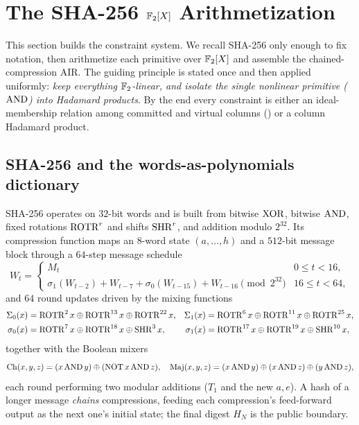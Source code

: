 \section{The SHA-256 $\mathbb{F}_2[X]$ Arithmetization}
\label{sec:arith}

This section builds the constraint system. We recall SHA-256 only enough
to fix notation, then arithmetize each primitive over $\mathbb{F}_2[X]$ and
assemble the chained-compression AIR. The guiding principle is stated
once and then applied uniformly: \emph{keep everything $\mathbb{F}_2$-linear,
and isolate the single nonlinear primitive ($\operatorname{AND}$) into Hadamard
products}. By the end every constraint is either an ideal-membership
relation among committed and virtual columns () or a
column Hadamard product.

\subsection{SHA-256 and the words-as-polynomials dictionary}
\label{sec:sha-recap}

SHA-256 operates on $32$-bit words and is built from bitwise $\operatorname{XOR}$,
bitwise $\operatorname{AND}$, fixed rotations $\operatorname{ROTR}^r$ and shifts $\operatorname{SHR}^r$, and
addition modulo $2^{32}$. Its compression function maps an $8$-word
state $(a,\dots,h)$ and a $512$-bit message block through a $64$-step
message schedule
\begin{equation}
  \label{eq:msched}
  W_t = \begin{cases}
    M_t & 0 \le t < 16,\\
    \sigma_1(W_{t-2}) + W_{t-7} + \sigma_0(W_{t-15}) + W_{t-16} \pmod{2^{32}}
    & 16 \le t < 64,
  \end{cases}
\end{equation}
and $64$ round updates driven by the mixing functions
\begin{align*}
  \Sigma_0(x) &= \operatorname{ROTR}^{2}x \oplus \operatorname{ROTR}^{13}x \oplus \operatorname{ROTR}^{22}x, &
  \Sigma_1(x) &= \operatorname{ROTR}^{6}x \oplus \operatorname{ROTR}^{11}x \oplus \operatorname{ROTR}^{25}x,\\
  \sigma_0(x) &= \operatorname{ROTR}^{7}x \oplus \operatorname{ROTR}^{18}x \oplus \operatorname{SHR}^{3}x, &
  \sigma_1(x) &= \operatorname{ROTR}^{17}x \oplus \operatorname{ROTR}^{19}x \oplus \operatorname{SHR}^{10}x,
\end{align*}
together with the Boolean mixers
\[
  \operatorname{Ch}(x,y,z) = (x \operatorname{AND} y)\oplus(\operatorname{NOT} x \operatorname{AND} z),
  \quad
  \operatorname{Maj}(x,y,z) = (x \operatorname{AND} y)\oplus(x \operatorname{AND} z)\oplus(y \operatorname{AND} z),
\]
each round performing two modular additions ($T_1$ and the new $a,e$). A hash of a longer message \emph{chains} compressions, feeding
each compression's feed-forward output as the next one's initial state;
the final digest $H_N$ is the public boundary.

